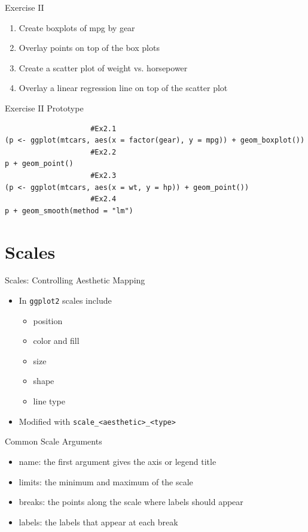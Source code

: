 \documentclass[table,smaller]{beamer}
\begin{document}
\begin{frame}[label=sec-3-4]{Exercise II}
\begin{enumerate}
\item Create boxplots of mpg by gear
\item Overlay points on top of the box plots
\item Create a scatter plot of weight vs. horsepower
\item Overlay a linear regression line on top of the scatter plot
\end{enumerate}
\end{frame}


\begin{frame}[fragile,label=sec-3-5]{Exercise II Prototype}
 \begin{verbatim}
					#Ex2.1
(p <- ggplot(mtcars, aes(x = factor(gear), y = mpg)) + geom_boxplot())
					#Ex2.2
p + geom_point()
					#Ex2.3
(p <- ggplot(mtcars, aes(x = wt, y = hp)) + geom_point())
					#Ex2.4
p + geom_smooth(method = "lm")
\end{verbatim}
\end{frame}


\section{Scales}
\label{sec-4}

\begin{frame}[fragile,label=sec-4-1]{Scales: Controlling Aesthetic Mapping}
 \begin{itemize}
\item In \texttt{ggplot2} \alert{scales} include
\begin{itemize}
\item position
\item color and fill
\item size
\item shape
\item line type
\end{itemize}
\item Modified with \texttt{scale\_<aesthetic>\_<type>}
\end{itemize}
\end{frame}

\begin{frame}[label=sec-4-2]{Common Scale Arguments}
\begin{itemize}
\item \alert{name}: the first argument gives the axis or legend title
\item \alert{limits}: the minimum and maximum of the scale
\item \alert{breaks}: the points along the scale where labels should appear
\item \alert{labels}: the labels that appear at each break
\end{itemize}
\end{frame}
\end{document}
